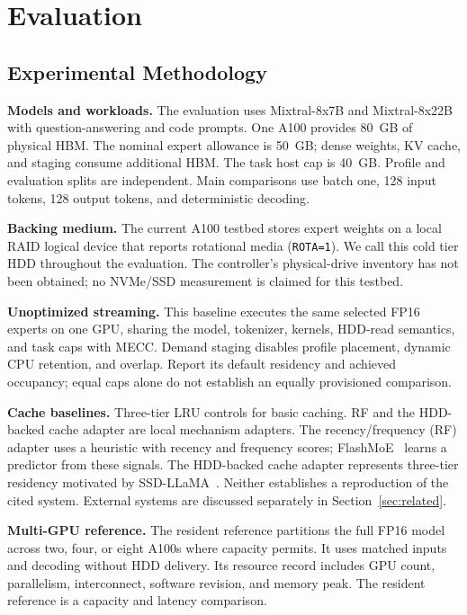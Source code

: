 \documentclass[conference,9pt,letterpaper]{IEEEtran}
\newcommand{\mecc}{\textsc{MECC}}
\begin{document}
\section{Evaluation}
\label{sec:evaluation}


\subsection{Experimental Methodology}
\textbf{Models and workloads.} The evaluation uses Mixtral-8x7B and Mixtral-8x22B~\cite{mixtral,mixtral22} with question-answering and code prompts. One A100 provides 80~GB of physical HBM. The nominal expert allowance is 50~GB; dense weights, KV cache, and staging consume additional HBM. The task host cap is 40~GB. Profile and evaluation splits are independent. Main comparisons use batch one, 128 input tokens, 128 output tokens, and deterministic decoding. 

\textbf{Backing medium.} The current A100 testbed stores expert weights on a local RAID logical device that reports rotational media (\texttt{ROTA=1}). We call this cold tier HDD throughout the evaluation. The controller's physical-drive inventory has not been obtained; no NVMe/SSD measurement is claimed for this testbed.

\textbf{Unoptimized streaming.} This baseline executes the same selected FP16 experts on one GPU, sharing the model, tokenizer, kernels, HDD-read semantics, and task caps with \mecc{}. Demand staging disables profile placement, dynamic CPU retention, and overlap. Report its default residency and achieved occupancy; equal caps alone do not establish an equally provisioned comparison.

\textbf{Cache baselines.} Three-tier LRU controls for basic caching. RF and the HDD-backed cache adapter are local mechanism adapters. The recency/frequency (RF) adapter uses a heuristic with recency and frequency scores; FlashMoE~\cite{flashmoe} learns a predictor from these signals. The HDD-backed cache adapter represents three-tier residency motivated by SSD-LLaMA~\cite{ssdllama}. Neither establishes a reproduction of the cited system. External systems are discussed separately in Section~\ref{sec:related}.

\textbf{Multi-GPU reference.} The resident reference partitions the full FP16 model across two, four, or eight A100s where capacity permits. It uses matched inputs and decoding without HDD delivery. Its resource record includes GPU count, parallelism, interconnect, software revision, and memory peak. The resident reference is a capacity and latency comparison.
\end{document}
